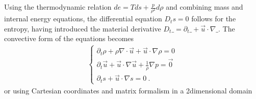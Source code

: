 \documentclass[letterpaper,10pt,english]{jupyterBook}
\begin{document}
\sphinxAtStartPar
Using the thermodynamic relation \(de = T ds + \frac{p}{\rho^2} d \rho\) and combining mass and internal energy equations, the differential equation \(D_t s = 0\) follows for the entropy, having introduced the material derivative \(D_t \_ = \partial_t \_ + \vec{u} \cdot \nabla \_\). The convective form of the equations becomes
\begin{equation}\label{equation:ch/pde/hyperbolic-nd-euler:eq:pde:hyperbolic:differential:convective:euler:rho-u-s}
\begin{split}\begin{cases}
  \partial_t \rho + \rho \nabla \cdot \vec{u} + \vec{u} \cdot \nabla \rho = 0 \\
  \partial_t \vec{u} + \vec{u} \cdot \nabla \vec{u} + \frac{1}{\rho} \nabla p = \vec{0} \\
  \partial_t s + \vec{u} \cdot \nabla s = 0 \ .
\end{cases}\end{split}
\end{equation}
\sphinxAtStartPar
or using Cartesian coordinates and matrix formalism in a 2\sphinxhyphen{}dimensional domain
\end{document}
